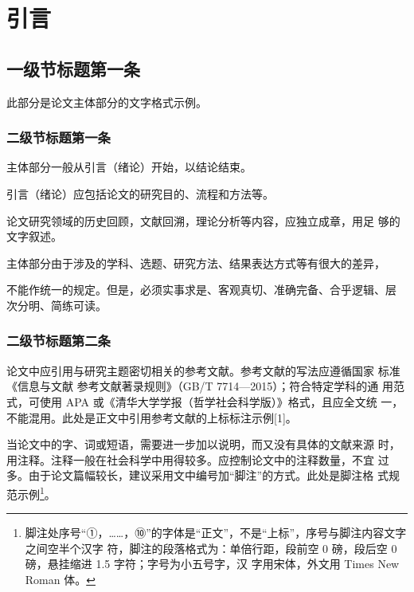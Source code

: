 
\chapter{引\quad 言}

\section{一级节标题第一条}

此部分是论文主体部分的文字格式示例。

\subsection{二级节标题第一条}

主体部分一般从引言（绪论）开始，以结论结束。

引言（绪论）应包括论文的研究目的、流程和方法等。

论文研究领域的历史回顾，文献回溯，理论分析等内容，应独立成章，用足
够的文字叙述。

主体部分由于涉及的学科、选题、研究方法、结果表达方式等有很大的差异，

不能作统一的规定。但是，必须实事求是、客观真切、准确完备、合乎逻辑、层
次分明、简练可读。

\subsection{二级节标题第二条}

论文中应引用与研究主题密切相关的参考文献。参考文献的写法应遵循国家
标准《信息与文献 参考文献著录规则》（GB/T 7714—2015）；符合特定学科的通
用范式，可使用 APA 或《清华大学学报（哲学社会科学版）》格式，且应全文统
一，不能混用。此处是正文中引用参考文献的上标标注示例[1]。

当论文中的字、词或短语，需要进一步加以说明，而又没有具体的文献来源
时，用注释。注释一般在社会科学中用得较多。应控制论文中的注释数量，不宜
过多。由于论文篇幅较长，建议采用文中编号加“脚注”的方式。此处是脚注格
式规范示例\footnote{脚注处序号“①，……，⑩”的字体是“正文”，不是“上标”，序号与脚注内容文字之间空半个汉字
符，脚注的段落格式为：单倍行距，段前空 0 磅，段后空 0 磅，悬挂缩进 1.5 字符；字号为小五号字，汉
字用宋体，外文用 Times New Roman 体。}。
